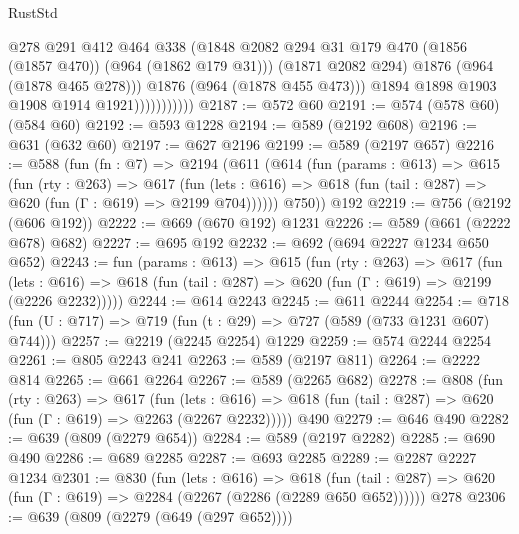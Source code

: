 \begin{lexlean}{RustStd}
\begin{coremodule}
                              @278
                              @291
                              @412
                              @464
                              @338
                              (@1848
                                @2082
                                @294
                                @31
                                @179
                                @470
                                (@1856 (@1857 @470))
                                (@964 (@1862 @179 @31)))
                              (@1871 @2082 @294)
                              @1876
                              (@964 (@1878 @465 @278)))
                            @1876
                            (@964 (@1878 @455 @473)))
                          @1894
                          @1898
                          @1903
                          @1908
                          @1914
                          @1921)))))))))))
@2187 := @572 @60
@2191 := @574 (@578 @60) (@584 @60)
@2192 := @593 @1228
@2194 := @589 (@2192 @608)
@2196 := @631 (@632 @60)
@2197 := @627 @2196
@2199 := @589 (@2197 @657)
@2216 := @588
    (fun (fn : @7) =>
    @2194
      (@611
        (@614
          (fun (params : @613) =>
          @615
            (fun (rty : @263) =>
            @617
              (fun (lets : @616) =>
              @618 (fun (tail : @287) => @620 (fun (Γ : @619) => @2199 @704))))))
        @750))
    @192
@2219 := @756 (@2192 (@606 @192))
@2222 := @669 (@670 @192) @1231
@2226 := @589 (@661 (@2222 @678) @682)
@2227 := @695 @192
@2232 := @692 (@694 @2227 @1234 @650 @652)
@2243 := fun (params : @613) =>
  @615
    (fun (rty : @263) =>
    @617
      (fun (lets : @616) =>
      @618 (fun (tail : @287) => @620 (fun (Γ : @619) => @2199 (@2226 @2232)))))
@2244 := @614 @2243
@2245 := @611 @2244
@2254 := @718 (fun (U : @717) => @719 (fun (t : @29) => @727 (@589 (@733 @1231 @607) @744)))
@2257 := @2219 (@2245 @2254) @1229
@2259 := @574 @2244 @2254
@2261 := @805 @2243 @241
@2263 := @589 (@2197 @811)
@2264 := @2222 @814
@2265 := @661 @2264
@2267 := @589 (@2265 @682)
@2278 := @808
    (fun (rty : @263) =>
    @617
      (fun (lets : @616) =>
      @618 (fun (tail : @287) => @620 (fun (Γ : @619) => @2263 (@2267 @2232)))))
    @490
@2279 := @646 @490
@2282 := @639 (@809 (@2279 @654))
@2284 := @589 (@2197 @2282)
@2285 := @690 @490
@2286 := @689 @2285
@2287 := @693 @2285
@2289 := @2287 @2227 @1234
@2301 := @830
    (fun (lets : @616) =>
    @618 (fun (tail : @287) => @620 (fun (Γ : @619) => @2284 (@2267 (@2286 (@2289 @650 @652))))))
    @278
@2306 := @639 (@809 (@2279 (@649 (@297 @652))))

\end{coremodule}
\end{lexlean}
